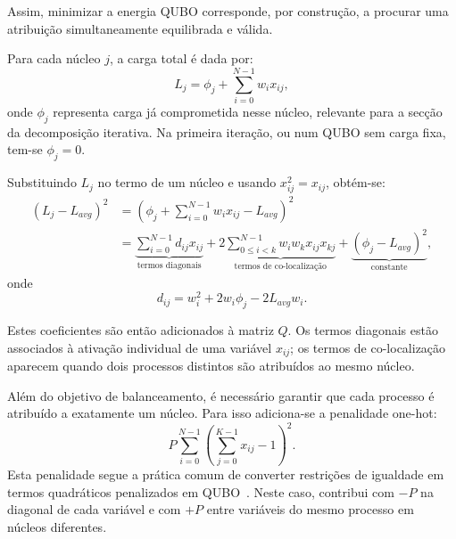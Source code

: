 \documentclass[12pt,a4paper]{article}
\begin{document}
Assim, minimizar a energia QUBO corresponde, por construção, a procurar uma atribuição
simultaneamente equilibrada e válida.

Para cada núcleo $j$, a carga total é dada por:
\begin{equation}
    L_j = \phi_j + \sum_{i=0}^{N-1} w_i x_{ij},
\end{equation}
onde $\phi_j$ representa carga já comprometida nesse núcleo, relevante para a secção da
decomposição iterativa. Na primeira iteração, ou num QUBO sem carga fixa, tem-se
$\phi_j = 0$.

Substituindo $L_j$ no termo de um núcleo e usando $x_{ij}^2=x_{ij}$, obtém-se:
\begin{equation}
\begin{aligned}
(L_j - L_{avg})^2
&= \left(\phi_j + \sum_{i=0}^{N-1}w_ix_{ij} - L_{avg}\right)^2 \\
&= \underbrace{\sum_{i=0}^{N-1} d_{ij}x_{ij}}_{\text{termos diagonais}}
 + 2\underbrace{\sum_{0 \leq i < k}^{N-1} w_iw_kx_{ij}x_{kj}}_{\text{termos de co-localização}}
 + \underbrace{(\phi_j - L_{avg})^2}_{\text{constante}},
\end{aligned}
\end{equation}
onde
\begin{equation}
    d_{ij}=w_i^2 + 2w_i\phi_j - 2L_{avg}w_i.
\end{equation}

Estes coeficientes são então
adicionados à matriz $Q$. Os termos diagonais estão associados
à ativação individual de uma variável $x_{ij}$; os termos de co-localização aparecem
quando dois processos distintos são atribuídos ao mesmo núcleo.

Além do objetivo de balanceamento, é necessário garantir que cada processo é atribuído a
exatamente um núcleo. Para isso adiciona-se a penalidade one-hot:
\begin{equation}
    P \sum_{i=0}^{N-1}\left(\sum_{j=0}^{K-1}x_{ij} - 1\right)^2.
\end{equation}
Esta penalidade segue a prática comum de converter restrições de igualdade em termos
quadráticos penalizados em QUBO~\cite{Glover2019QUBO}. Neste caso, contribui com $-P$
na diagonal de cada variável e com $+P$ entre variáveis do mesmo processo em núcleos diferentes.
\end{document}
